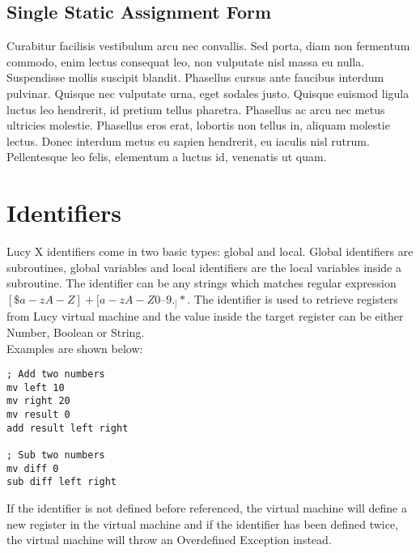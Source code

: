 \subsection{Single Static Assignment Form}
Curabitur facilisis vestibulum arcu nec convallis. Sed porta, diam non fermentum commodo, enim lectus consequat leo, non vulputate nisl massa eu nulla. Suspendisse mollis suscipit blandit. Phasellus cursus ante faucibus interdum pulvinar. Quisque nec vulputate urna, eget sodales justo. Quisque euismod ligula luctus leo hendrerit, id pretium tellus pharetra. Phasellus ac arcu nec metus ultricies molestie. Phasellus eros erat, lobortis non tellus in, aliquam molestie lectus. Donec interdum metus eu sapien hendrerit, eu iaculis nisl rutrum. Pellentesque leo felis, elementum a luctus id, venenatis ut quam.


\section{Identifiers}
Lucy X identifiers come in two basic types: global and local. Global identifiers are subroutines, global variables and local identifiers are the local variables inside a subroutine. The identifier can be any strings which matches regular expression $[\$a-zA-Z]+[a-zA-Z0–9._]*$. The identifier is used to retrieve registers from Lucy virtual machine and the value inside the target register can be either Number, Boolean or String. \\
Examples are shown below:
\begin{lstlisting}[language=LucyX]
; Add two numbers
mv left 10
mv right 20
mv result 0
add result left right

; Sub two numbers
mv diff 0
sub diff left right
\end{lstlisting}
If the identifier is not defined before referenced, the virtual machine will define a new register in the virtual machine and if the identifier has been defined twice, the virtual machine will throw an Overdefined Exception instead.


